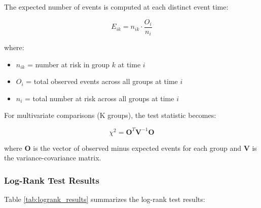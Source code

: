 \documentclass[12pt,a4paper]{article}
\begin{document}
The expected number of events is computed at each distinct event time:

\begin{equation}
E_{ik} = n_{ik} \cdot \frac{O_i}{n_i}
\label{eq:logrank_expected}
\end{equation}

where:
\begin{itemize}
    \item \(n_{ik}\) = number at risk in group \(k\) at time \(i\)
    \item \(O_i\) = total observed events across all groups at time \(i\)
    \item \(n_i\) = total number at risk across all groups at time \(i\)
\end{itemize}

For multivariate comparisons (K groups), the test statistic becomes:

\begin{equation}
\chi^2 = \mathbf{O}^T \mathbf{V}^{-1} \mathbf{O}
\label{eq:multivariate_logrank}
\end{equation}

where \(\mathbf{O}\) is the vector of observed minus expected events for each group and \(\mathbf{V}\) is the variance-covariance matrix.

\subsubsection{Log-Rank Test Results}

Table \ref{tab:logrank_results} summarizes the log-rank test results:
\end{document}
